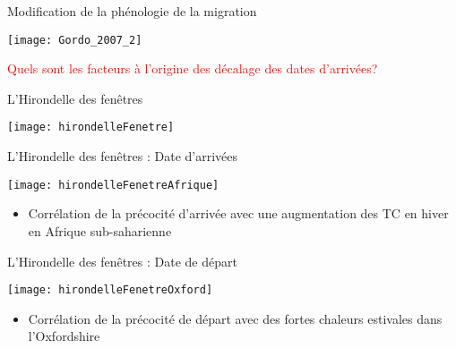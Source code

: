 \documentclass[10pt]{beamer}
\begin{document}
 \begin{frame}{Modification de la phénologie de la migration}
  \begin{center}
   \texttt{[image: Gordo\_2007\_2]}
  
  \vspace{20pt}
    \textcolor{red}{Quels sont les facteurs à l’origine des décalage des dates d'arrivées?}
    
  \end{center}
  \begin{tiny}
   \cite{Gordo2007}
  \end{tiny}
\end{frame}

\begin{frame}{L'Hirondelle des fenêtres}
  \begin{center}
    \texttt{[image: hirondelleFenetre]}
  \end{center}
  \begin{tiny}
    \cite{Cotton2003}

  \end{tiny}
\end{frame}

\begin{frame}{L'Hirondelle des fenêtres : Date d'arrivées}
  \begin{center}
    \texttt{[image: hirondelleFenetreAfrique]}
  \end{center}
  \vspace{10pt}
  \begin{itemize}
   \item <2> Corrélation de la précocité d’arrivée avec une augmentation des T\degres C en hiver en Afrique sub-saharienne
  \end{itemize}
  \begin{tiny}
   \cite{Cotton2003}

  \end{tiny}
\end{frame}

\begin{frame}{L'Hirondelle des fenêtres : Date de départ}
  \begin{center}
    \texttt{[image: hirondelleFenetreOxford]}
  \end{center}
  \vspace{10pt}
    \begin{itemize}
   \item <2> Corrélation de la précocité de départ avec des fortes chaleurs estivales dans l’Oxfordshire
    \end{itemize}
  \begin{tiny}
    \cite{Cotton2003}
  \end{tiny}
\end{frame}
\end{document}
